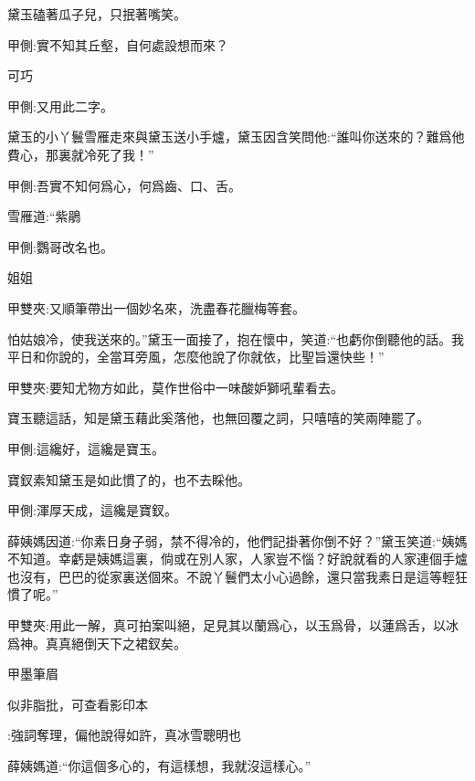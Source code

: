 \begin{parag}
    黛玉磕著瓜子兒，只抿著嘴笑。\begin{note}甲側:實不知其丘壑，自何處設想而來？\end{note}可巧\begin{note}甲側:又用此二字。\end{note}黛玉的小丫鬟雪雁走來與黛玉送小手爐，黛玉因含笑問他:“誰叫你送來的？難爲他費心，那裏就冷死了我！”\begin{note}甲側:吾實不知何爲心，何爲齒、口、舌。\end{note}雪雁道:“紫鵑\begin{note}甲側:鸚哥改名也。\end{note}姐姐\begin{note}甲雙夾:又順筆帶出一個妙名來，洗盡春花臘梅等套。\end{note}怕姑娘冷，使我送來的。”黛玉一面接了，抱在懷中，笑道:“也虧你倒聽他的話。我平日和你說的，全當耳旁風，怎麼他說了你就依，比聖旨還快些！”\begin{note}甲雙夾:要知尤物方如此，莫作世俗中一味酸妒獅吼輩看去。\end{note}寶玉聽這話，知是黛玉藉此奚落他，也無回覆之詞，只嘻嘻的笑兩陣罷了。\begin{note}甲側:這纔好，這纔是寶玉。\end{note}寶釵素知黛玉是如此慣了的，也不去睬他。\begin{note}甲側:渾厚天成，這纔是寶釵。\end{note}薛姨媽因道:“你素日身子弱，禁不得冷的，他們記掛著你倒不好？”黛玉笑道:“姨媽不知道。幸虧是姨媽這裏，倘或在別人家，人家豈不惱？好說就看的人家連個手爐也沒有，巴巴的從家裏送個來。不說丫鬟們太小心過餘，還只當我素日是這等輕狂慣了呢。”\begin{note}甲雙夾:用此一解，真可拍案叫絕，足見其以蘭爲心，以玉爲骨，以蓮爲舌，以冰爲神。真真絕倒天下之裙釵矣。\end{note}\begin{note}甲墨筆眉\begin{subnote}似非脂批，可查看影印本\end{subnote}:強詞奪理，偏他說得如許，真冰雪聰明也\end{note}薛姨媽道:“你這個多心的，有這樣想，我就沒這樣心。”
\end{parag}


